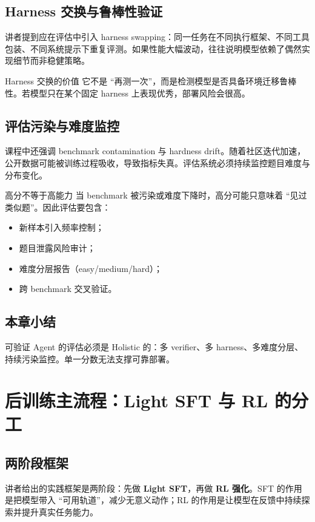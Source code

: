 \documentclass[a4paper]{article}
\begin{document}
\subsection{Harness 交换与鲁棒性验证}
讲者提到应在评估中引入 harness swapping：同一任务在不同执行框架、不同工具包装、不同系统提示下重复评测。如果性能大幅波动，往往说明模型依赖了偶然实现细节而非稳健策略。

\begin{importantbox}{Harness 交换的价值}
它不是 ``再测一次''，而是检测模型是否具备环境迁移鲁棒性。若模型只在某个固定 harness 上表现优秀，部署风险会很高。
\end{importantbox}

\subsection{评估污染与难度监控}
课程中还强调 benchmark contamination 与 hardness drift。随着社区迭代加速，公开数据可能被训练过程吸收，导致指标失真。评估系统必须持续监控题目难度与分布变化。

\begin{warningbox}{高分不等于高能力}
当 benchmark 被污染或难度下降时，高分可能只意味着 ``见过类似题''。因此评估要包含：
\begin{itemize}
    \item 新样本引入频率控制；
    \item 题目泄露风险审计；
    \item 难度分层报告（easy/medium/hard）；
    \item 跨 benchmark 交叉验证。
\end{itemize}
\end{warningbox}

\subsection{本章小结}
可验证 Agent 的评估必须是 Holistic 的：多 verifier、多 harness、多难度分层、持续污染监控。单一分数无法支撑可靠部署。

\section{后训练主流程：Light SFT 与 RL 的分工}

\subsection{两阶段框架}
讲者给出的实践框架是两阶段：先做 \textbf{Light SFT}，再做 \textbf{RL 强化}。SFT 的作用是把模型带入 ``可用轨道''，减少无意义动作；RL 的作用是让模型在反馈中持续探索并提升真实任务能力。
\end{document}
